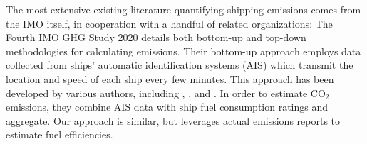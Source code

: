 \documentclass[hidelinks, 12pt,letterpaper]{article}
\begin{document}
 
 
%
%


The most extensive existing literature quantifying shipping emissions comes from the IMO itself, in cooperation with a handful of related organizations: The Fourth IMO GHG Study 2020 \citep{faber2020fourth} details both bottom-up and top-down methodologies for calculating emissions. Their bottom-up approach employs data collected from ships' automatic identification systems (AIS) which transmit the location and speed of each ship every few minutes. This approach has been developed by various authors, including \citet{jalkanen2009modelling}, \citet{olmer2017greenhouse}, and \citet{johansson2017global}. In order to estimate CO$_2$ emissions, they combine AIS data with ship fuel consumption ratings and aggregate. Our approach is similar, but leverages actual emissions reports to estimate fuel efficiencies.
\end{document}

